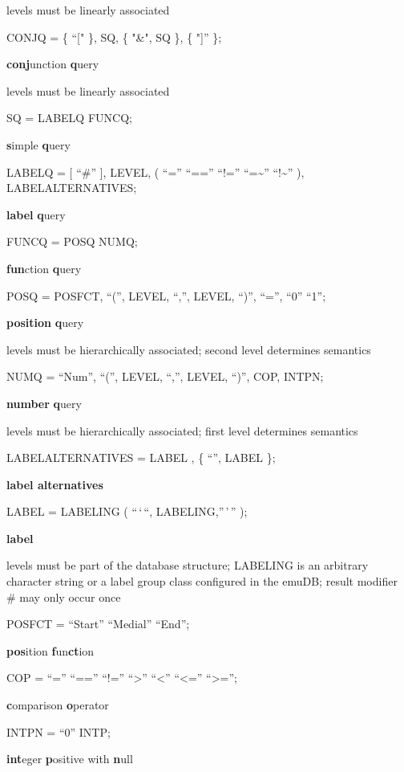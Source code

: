 \documentclass[
]{book}
\begin{document}
levels must be linearly associated

CONJQ = \{ ``{[}" \}, SQ, \{ "\&", SQ \}, \{ "{]}'' \};

\textbf{conj}unction \textbf{q}uery

levels must be linearly associated

SQ = LABELQ \textbar{} FUNCQ;

\textbf{s}imple \textbf{q}uery

LABELQ = {[} ``\#'' {]}, LEVEL, ( ``='' \textbar{} ``=='' \textbar{} ``!='' \textbar{} ``=\textasciitilde{}'' \textbar{} ``!\textasciitilde{}'' ), LABELALTERNATIVES;

\textbf{label} \textbf{q}uery

FUNCQ = POSQ \textbar{} NUMQ;

\textbf{fun}ction \textbf{q}uery

POSQ = POSFCT, ``('', LEVEL, ``,'', LEVEL, ``)'', ``='', ``0'' \textbar{} ``1'';

\textbf{position} \textbf{q}uery

levels must be hierarchically associated; second level determines semantics

NUMQ = ``Num'', ``('', LEVEL, ``,'', LEVEL, ``)'', COP, INTPN;

\textbf{number} \textbf{q}uery

levels must be hierarchically associated; first level determines semantics

LABELALTERNATIVES = LABEL , \{ ``\textbar{}'', LABEL \};

\textbf{label alternatives}

LABEL = LABELING \textbar{} ( ``\,`\,``, LABELING,''\,'\,'' );

\textbf{label}

levels must be part of the database structure; LABELING is an arbitrary character string or a label group class configured in the emuDB; result modifier \# may only occur once

POSFCT = ``Start'' \textbar{} ``Medial'' \textbar{} ``End'';

\textbf{pos}ition \textbf{f}un\textbf{ct}ion

COP = ``='' \textbar{} ``=='' \textbar{} ``!='' \textbar{} ``\textgreater{}'' \textbar{} ``\textless{}'' \textbar{} ``\textless='' \textbar{} ``\textgreater='';

\textbf{c}omparison \textbf{o}perator

INTPN = ``0'' \textbar{} INTP;

\textbf{int}eger \textbf{p}ositive with \textbf{n}ull
\end{document}
